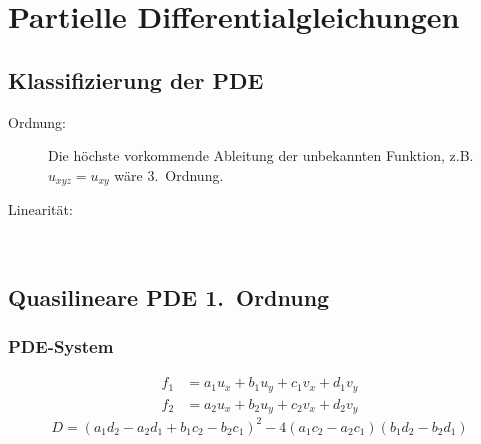 
\section{Partielle Differentialgleichungen} %
	\subsection{Klassifizierung der PDE} %
		\begin{description}
			\item[Ordnung:] Die höchste vorkommende Ableitung der unbekannten
			Funktion, z.B.~$u_{xyz} = u_{xy}$ wäre 3.~Ordnung.
			\item[Linearität:]
			~
		\end{description}
	\subsection{Quasilineare PDE 1.~Ordnung} %
		\subsubsection{PDE-System} %
			\begin{align*}
				f_1 &= a_1 u_x + b_1 u_y + c_1 v_x + d_1 v_y \\
				f_2 &= a_2 u_x + b_2 u_y + c_2 v_x + d_2 v_y
			\end{align*}
			\[
				D = (a_1 d_2 - a_2 d_1 + b_1 c_2 - b_2 c_1)^2 -
				4(a_1 c_2 - a_2 c_1)(b_1 d_2 - b_2 d_1)
			\]
